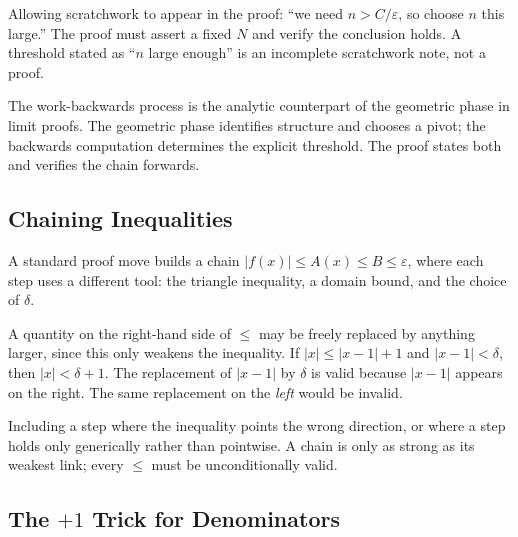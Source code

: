 \begin{remark}
Allowing scratchwork to appear in the proof: ``we need $n>C/\varepsilon$, so
choose $n$ this large.'' The proof must assert a fixed $N$ and verify the
conclusion holds. A threshold stated as ``$n$ large enough'' is an incomplete
scratchwork note, not a proof.
\end{remark}

\begin{remark}
The work-backwards process is the analytic counterpart of the geometric phase
in limit proofs. The geometric phase identifies structure and chooses a pivot;
the backwards computation determines the explicit threshold. The proof states
both and verifies the chain forwards.
\end{remark}

\subsection*{Chaining Inequalities}
\label{subsec:chaining}

A standard proof move builds a chain
$|f(x)|\leq A(x)\leq B\leq\varepsilon$,
where each step uses a different tool: the triangle inequality, a domain
bound, and the choice of $\delta$.

\begin{remark}
A quantity on the right-hand side of $\leq$ may be freely replaced by
anything larger, since this only weakens the inequality. If
$|x|\leq|x-1|+1$ and $|x-1|<\delta$, then $|x|<\delta+1$. The replacement
of $|x-1|$ by $\delta$ is valid because $|x-1|$ appears on the right. The
same replacement on the \emph{left} would be invalid.
\end{remark}

\begin{remark}
Including a step where the inequality points the wrong direction, or where
a step holds only generically rather than pointwise. A chain is only as
strong as its weakest link; every $\leq$ must be unconditionally valid.
\end{remark}

\subsection*{\texorpdfstring{The $+1$ Trick for Denominators}{The +1 Trick for Denominators}}
\label{subsec:plus-one}

